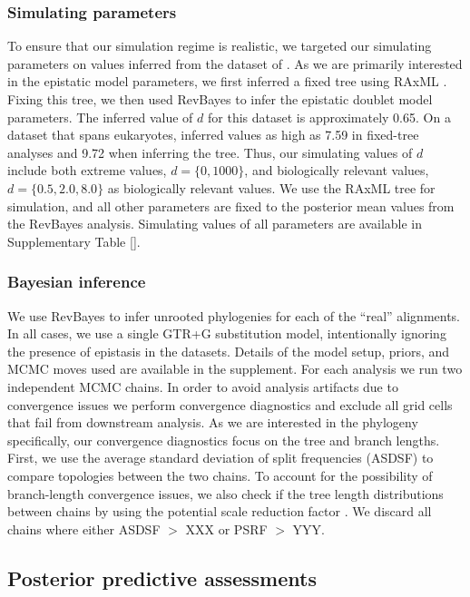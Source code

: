 \documentclass[11pt]{article}
\begin{document}
\subsubsection*{Simulating parameters\label{sec:tunicates}}
To ensure that our simulation regime is realistic, we targeted our simulating parameters on values inferred from the dataset of \cite{tsagkogeorga2009updated}.
As we are primarily interested in the epistatic model parameters, we first inferred a fixed tree using RAxML \citep{stamatakis2014raxml}.
Fixing this tree, we then used RevBayes \cite{hohna2016revbayes} to infer the epistatic doublet model parameters.
The inferred value of $d$ for this dataset is approximately 0.65.
On a dataset that spans eukaryotes, \citet{nasrallah2013phylogenetic} inferred values as high as 7.59 in fixed-tree analyses and 9.72 when inferring the tree.
Thus, our simulating values of $d$ include both extreme values, $d=\{0,1000\}$, and biologically relevant values, $d = \{0.5,2.0,8.0\}$ as biologically relevant values.
We use the RAxML tree for simulation, and all other parameters are fixed to the posterior mean values from the RevBayes analysis.
Simulating values of all parameters are available in Supplementary Table \ref{}.

\subsubsection*{Bayesian inference\label{sec:mcmc}}
We use RevBayes \citep{hohna2016revbayes} to infer unrooted phylogenies for each of the ``real'' alignments.
In all cases, we use a single GTR+G substitution model, intentionally ignoring the presence of epistasis in the datasets.
Details of the model setup, priors, and MCMC moves used are available in the supplement.
For each analysis we run two independent MCMC chains.
In order to avoid analysis artifacts due to convergence issues we perform convergence diagnostics and exclude all grid cells that fail from downstream analysis.
As we are interested in the phylogeny specifically, our convergence diagnostics focus on the tree and branch lengths.
First, we use the average standard deviation of split frequencies (ASDSF) to compare topologies between the two chains.
To account for the possibility of branch-length convergence issues, we also check if the tree length distributions between chains by using the potential scale reduction factor \citep[PSRF,\ ][]{brooks1998general}.
We discard all chains where either ASDSF $>$ XXX or PSRF $>$ YYY.


\subsection*{Posterior predictive assessments\label{sec:pps}}
\end{document}
